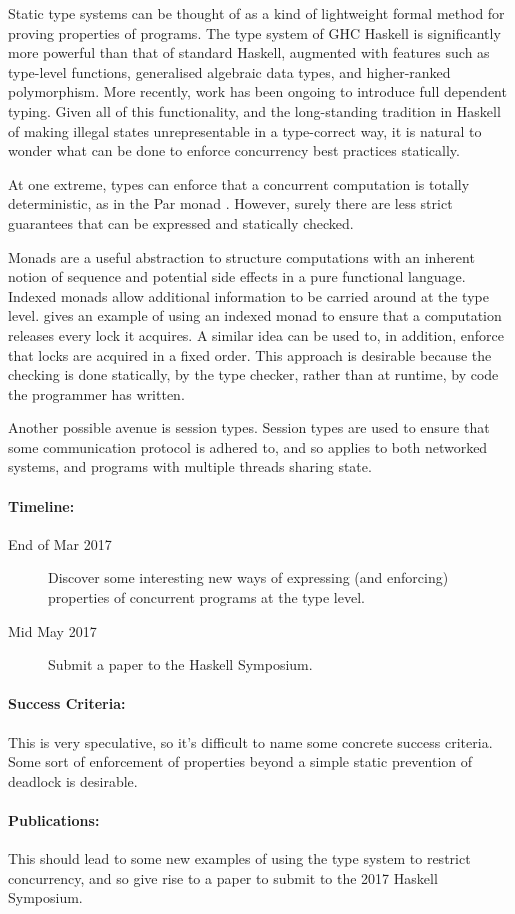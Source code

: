 Static type systems can be thought of as a kind of lightweight formal
method for proving properties of programs. The type system of GHC
Haskell is significantly more powerful than that of standard Haskell,
augmented with features such as type-level functions, generalised
algebraic data types, and higher-ranked polymorphism. More recently,
work has been ongoing to introduce full dependent typing. Given all of
this functionality, and the long-standing tradition in Haskell of
making illegal states unrepresentable in a type-correct way, it is
natural to wonder what can be done to enforce concurrency best
practices statically.

At one extreme, types can enforce that a concurrent computation is
totally deterministic, as in the Par monad \citep{parmonad}. However,
surely there are less strict guarantees that can be expressed and
statically checked.

Monads are a useful abstraction to structure computations with an
inherent notion of sequence and potential side effects in a pure
functional language. Indexed monads allow additional information to be
carried around at the type level. \citep{typefun} gives an example of
using an indexed monad to ensure that a computation releases every
lock it acquires. A similar idea can be used to, in addition, enforce
that locks are acquired in a fixed order. This approach is desirable
because the checking is done statically, by the type checker, rather
than at runtime, by code the programmer has written.

Another possible avenue is session types. Session types are used to
ensure that some communication protocol is adhered to, and so applies
to both networked systems, and programs with multiple threads sharing
state.

\paragraph{Timeline:}

\begin{description}
\item[End of Mar 2017] Discover some interesting new ways of
  expressing (and enforcing) properties of concurrent programs at the
  type level.
\item[Mid May 2017] Submit a paper to the Haskell Symposium.
\end{description}

\paragraph{Success Criteria:}

This is very speculative, so it's difficult to name some concrete
success criteria. Some sort of enforcement of properties beyond a
simple static prevention of deadlock is desirable.

\paragraph{Publications:}

This should lead to some new examples of using the type system to
restrict concurrency, and so give rise to a paper to submit to the
2017 Haskell Symposium.
